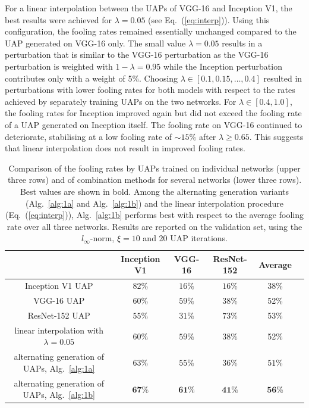 \documentclass[runningheads]{llncs}
\begin{document}
For a linear interpolation between the UAPs of VGG-16 and Inception V1, the best results were achieved for \(\lambda=0.05\) (see Eq.~(\ref{eq:interp})). Using this configuration, the fooling rates remained essentially unchanged compared to the UAP generated on VGG-16 only.
The small value \(\lambda=0.05\) results in a perturbation that is similar to the VGG-16 perturbation as the VGG-16 perturbation is weighted with \(1-\lambda=0.95\) while the Inception perturbation contributes only with a weight of 5\%. Choosing \(\lambda\in\left[0.1,0.15,\ldots,0.4\right]\) resulted in perturbations with lower fooling rates for both models with respect to the rates achieved by separately training UAPs on the two networks. For \(\lambda \in\left[0.4,1.0\right]\), the fooling rates for Inception improved again but did not exceed the fooling rate of a UAP generated on Inception itself. The fooling rate on VGG-16 continued to deteriorate, stabilising at a low fooling rate of \(\sim 15\%\) after \(\lambda\geq 0.65\). This suggests that linear interpolation does not result in improved fooling rates.
\begin{table}
\centering

\begin{tabular}{|c|c|c|c|c|c|}
\hline
											&	Inception	V1&	VGG-16		&	ResNet-152	& Average	\\ \hline
Inception V1 UAP							&	\(82\%\)		&	\(16\%\)	&	\(16\%\)	&38\%	\\
VGG-16 UAP								&	\(60\%\)		&	\(59\%\)	&	\(38\%\)	&52\%	\\
ResNet-152 UAP &	\(55\%\)		&	\(31\%\)	&	\(73\%\)&53\%		\\ \hline
linear interpolation with \(\lambda=0.05\)	&	\(60\%\)		&	\(59\%\)	&	\(38\%\)	&52\%\\
alternating generation of UAPs, Alg.~\ref{alg:1a}&	\(63\%\)		&	\(55\%\)	&	\(36\%\)	& \(51\%\)	\\
alternating generation of UAPs, Alg.~\ref{alg:1b}&	\(\mathbf{67}\%\)		&	\(\mathbf{61}\%\)	&	\(\mathbf{41}\%\)		&\(\mathbf{56}\)\%\\
\hline 
\end{tabular}

\caption{Comparison of the fooling rates by UAPs trained on individual networks (upper three rows) and of combination methods for several networks (lower three rows). Best values are shown in bold. Among the alternating generation variants (Alg.~\ref{alg:1a} and Alg.~\ref{alg:1b}) and the linear interpolation procedure (Eq.~(\ref{eq:interp})), Alg.~\ref{alg:1b} performs best with respect to the average fooling rate over all three networks. Results are reported on the validation set, using the $l_\infty$-norm, $\xi=10$ and 20 UAP iterations.}\label{tab:vergleich_comb}
\end{table}
\end{document}
